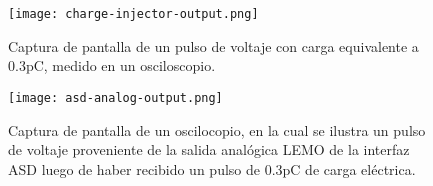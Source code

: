 
\begin{figure}[h]
	\centering
	\texttt{[image: charge-injector-output.png]}
	\caption{Captura de pantalla de un pulso de voltaje con carga equivalente a 0.3pC, medido en un osciloscopio.}
	\label{img:charge-injector-output}
\end{figure}

\begin{figure}[h]
	\centering
	\texttt{[image: asd-analog-output.png]}
	\caption{Captura de pantalla de un oscilocopio, en la cual se ilustra un pulso de voltaje proveniente de la salida analógica LEMO de la interfaz ASD luego de haber recibido un pulso de 0.3pC de carga eléctrica.}
	\label{img:asd-analog-output}
\end{figure}


